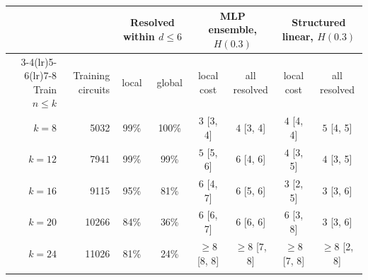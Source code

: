 \begin{tabular}{rrcccccc}
\toprule
 & & \multicolumn{2}{c}{Resolved within $d\le6$} & \multicolumn{2}{c}{MLP ensemble, $H(0.3)$} & \multicolumn{2}{c}{Structured linear, $H(0.3)$} \\
\cmidrule(lr){3-4}\cmidrule(lr){5-6}\cmidrule(lr){7-8}
Train $n\le k$ & Training circuits & local & global & local cost & all resolved & local cost & all resolved \\
\midrule
$k=8$ & 5032 & 99\% & 100\% & $3$ [3, 4] & $4$ [3, 4] & $4$ [4, 4] & $5$ [4, 5] \\
$k=12$ & 7941 & 99\% & 99\% & $5$ [5, 6] & $6$ [4, 6] & $4$ [3, 5] & $4$ [3, 5] \\
$k=16$ & 9115 & 95\% & 81\% & $6$ [4, 7] & $6$ [5, 6] & $3$ [2, 5] & $3$ [3, 6] \\
$k=20$ & 10266 & 84\% & 36\% & $6$ [6, 7] & $6$ [6, 6] & $6$ [3, 8] & $3$ [3, 6] \\
$k=24$ & 11026 & 81\% & 24\% & $\ge8$ [8, 8] & $\ge8$ [7, 8] & $\ge8$ [7, 8] & $\ge8$ [2, 8] \\
\botrule
\end{tabular}
